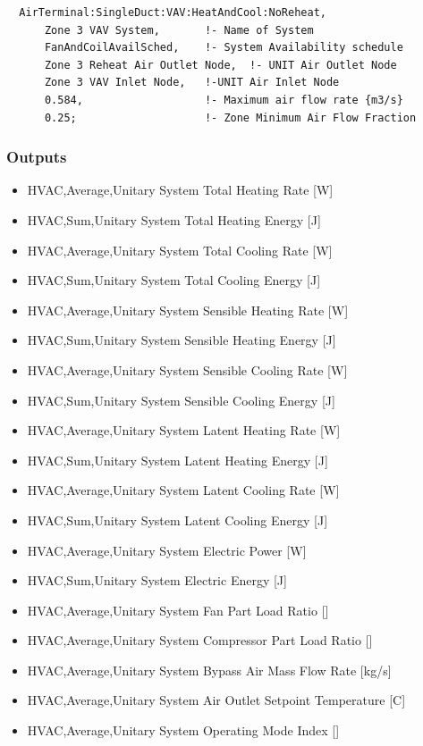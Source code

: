 \begin{lstlisting}
  AirTerminal:SingleDuct:VAV:HeatAndCool:NoReheat,
      Zone 3 VAV System,       !- Name of System
      FanAndCoilAvailSched,    !- System Availability schedule
      Zone 3 Reheat Air Outlet Node,  !- UNIT Air Outlet Node
      Zone 3 VAV Inlet Node,   !-UNIT Air Inlet Node
      0.584,                   !- Maximum air flow rate {m3/s}
      0.25;                    !- Zone Minimum Air Flow Fraction
\end{lstlisting}

\subsubsection{Outputs}\label{outputs-7-011}

\begin{itemize}
\item
  HVAC,Average,Unitary System Total Heating Rate {[}W{]}
\item
  HVAC,Sum,Unitary System Total Heating Energy {[}J{]}
\item
  HVAC,Average,Unitary System Total Cooling Rate {[}W{]}
\item
  HVAC,Sum,Unitary System Total Cooling Energy {[}J{]}
\item
  HVAC,Average,Unitary System Sensible Heating Rate {[}W{]}
\item
  HVAC,Sum,Unitary System Sensible Heating Energy {[}J{]}
\item
  HVAC,Average,Unitary System Sensible Cooling Rate {[}W{]}
\item
  HVAC,Sum,Unitary System Sensible Cooling Energy {[}J{]}
\item
  HVAC,Average,Unitary System Latent Heating Rate {[}W{]}
\item
  HVAC,Sum,Unitary System Latent Heating Energy {[}J{]}
\item
  HVAC,Average,Unitary System Latent Cooling Rate {[}W{]}
\item
  HVAC,Sum,Unitary System Latent Cooling Energy {[}J{]}
\item
  HVAC,Average,Unitary System Electric Power {[}W{]}
\item
  HVAC,Sum,Unitary System Electric Energy {[}J{]}
\item
  HVAC,Average,Unitary System Fan Part Load Ratio {[]}
\item
  HVAC,Average,Unitary System Compressor Part Load Ratio {[]}
\item
  HVAC,Average,Unitary System Bypass Air Mass Flow Rate {[}kg/s{]}
\item
  HVAC,Average,Unitary System Air Outlet Setpoint Temperature {[}C{]}
\item
  HVAC,Average,Unitary System Operating Mode Index {[]}
\end{itemize}


